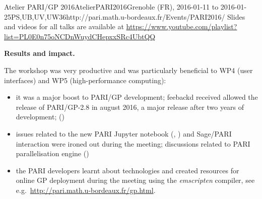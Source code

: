 \begin{event}{Atelier PARI/GP 2016}{AtelierPARI2016}{Grenoble (FR),
2016-01-11 to 2016-01-25}{PS,UB,UV,UW}{36}{http://pari.math.u-bordeaux.fr/Events/PARI2016/}
Slides and videos for all talks are available at
\url{https://www.youtube.com/playlist?list=PL0E0n75oNCDnWuydCHepxxSRc4UbtQQ}

\textbf{Results and impact.} 

The workshop was very productive and was particularly beneficial to WP4 (user
interfaces) and WP5 (high-performance computing):
\begin{itemize}
\item it was a major boost to PARI/GP development; feebackd received allowed
the release of PARI/GP-2.8 in august 2016, a major release after two years of
development; ()

\item issues related to the new PARI Jupyter notebook (, ) and
Sage/PARI interaction were ironed out during the meeting; discussions related
to PARI parallelisation engine ()

\item the PARI developers learnt about technologies and created resources for
online GP deployment during the meeting using the \emph{emscripten} compiler,
see e.g.~\url{http://pari.math.u-bordeaux.fr/gp.html}.
\end{itemize}

\end{event}
